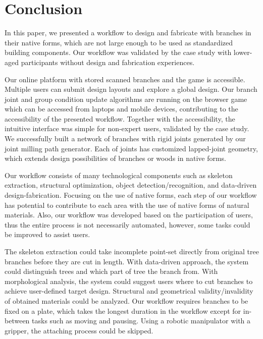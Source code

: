 \section{Conclusion}
In this paper, we presented a workflow to design and fabricate with branches in their native forms, which are not large enough to be used as standardized building components.
Our workflow was validated by the case study with lower-aged participants without design and fabrication experiences.

Our online platform with stored scanned branches and the game is accessible.
Multiple users can submit design layouts and explore a global design. %
Our branch joint and group condition update algorithms are running on the browser game which can be accessed from laptops and mobile devices, contributing to the accessibility of the presented workflow.
Together with the accessibility, the intuitive interface was simple for non-expert users, validated by the case study.
We successfully built a network of branches with rigid joints generated by our joint milling path generator.
Each of joints has customized lapped-joint geometry, which extends design possibilities of branches or woods in native forms.

Our workflow consists of many technological components such as skeleton extraction, structural optimization, object detection/recognition, and data-driven design-fabrication.
Focusing on the use of native forms, each step of our workflow has potential to contribute to each area with the use of native forms of natural materials.
Also, our workflow was developed based on the participation of users, thus the entire process is not necessarily automated, however, some tasks could be improved to assist users.

The skeleton extraction could take incomplete point-set directly from original tree branches before they are cut in length.
With data-driven approach, the system could distinguish trees and which part of tree the branch from.
With morphological analysis, the system could suggest users where to cut branches to achieve user-defined target design.
Structural and geometrical validity/invalidity of obtained materials could be analyzed.
Our workflow requires branches to be fixed on a plate, which takes the longest duration in the workflow except for in-between tasks such as moving and pausing.
Using a robotic manipulator with a gripper, the attaching process could be skipped.

